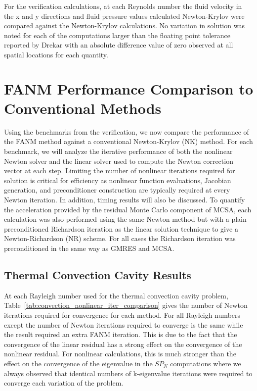 For the verification calculations, at each Reynolds number the fluid
velocity in the x and y directions and fluid pressure values
calculated Newton-Krylov were compared against the Newton-Krylov
calculations. No variation in solution was noted for each of the
computations larger than the floating point tolerance reported by
Drekar with an absolute difference value of zero observed at all
spatial locations for each quantity.

\section{FANM Performance Comparison to Conventional Methods\ }
\label{sec:fanm_comparison}

Using the benchmarks from the verification, we now compare the
performance of the FANM method against a conventional Newton-Krylov
(NK) method. For each benchmark, we will analyze the iterative
performance of both the nonlinear Newton solver and the linear solver
used to compute the Newton correction vector at each step. Limiting
the number of nonlinear iterations required for solution is critical
for efficiency as nonlinear function evaluations, Jacobian generation,
and preconditioner construction are typically required at every Newton
iteration. In addition, timing results will also be discussed. To
quantify the acceleration provided by the residual Monte Carlo
component of MCSA, each calculation was also performed using the same
Newton method but with a plain preconditioned Richardson iteration as
the linear solution technique to give a Newton-Richardson (NR)
scheme. For all cases the Richardson iteration was preconditioned
in the same way as GMRES and MCSA.

\subsection{Thermal Convection Cavity Results}
\label{subsec:thermal_convection_comparison}

At each Rayleigh number used for the thermal convection cavity
problem, Table~\ref{tab:convection_nonlinear_iter_comparison} gives
the number of Newton iterations required for convergence for each
method.  For all Rayleigh numbers except  the number of
Newton iterations required to converge is the same while the 
result required an extra FANM iteration. This is due to the fact that
the convergence of the linear residual has a strong effect on the
convergence of the nonlinear residual. For nonlinear calculations,
this is much stronger than the effect on the convergence of the
eigenvalue in the $SP_N$ computations where we always observed that
identical numbers of k-eigenvalue iterations were required to converge
each variation of the problem.

